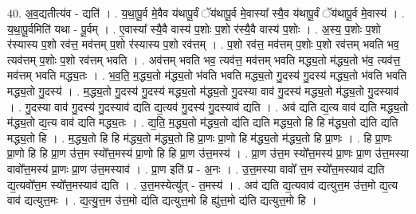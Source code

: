 \documentclass[17pt]{extarticle}
\begin{document}
40. अ॒व॒द्यतीत्य॑व - द्यति॑ । . य॒था॒पू॒र्व मे॒वैव य॑थापू॒र्वं ॅय॑थापू॒र्व मे॒वास्या᳚ स्यै॒व य॑थापू॒र्वं ॅय॑थापू॒र्व मे॒वास्य॑ । . य॒था॒पू॒र्वमिति॑ यथा - पू॒र्वम् । . ए॒वास्या᳚ स्यै॒वै वास्य॑ प॒शोः प॒शो र॑स्यै॒वै वास्य॑ प॒शोः । . अ॒स्य॒ प॒शोः प॒शो र॑स्यास्य प॒शो रव॑त्त॒ मव॑त्तम् प॒शो र॑स्यास्य प॒शो रव॑त्तम् । . प॒शो रव॑त्त॒ मव॑त्तम् प॒शोः प॒शो रव॑त्तम् भवति भव॒ त्यव॑त्तम् प॒शोः प॒शो रव॑त्तम् भवति । . अव॑त्तम् भवति भव॒ त्यव॑त्त॒ मव॑त्तम् भवति मद्ध्य॒तो म॑द्ध्य॒तो भ॑व॒ त्यव॑त्त॒ मव॑त्तम् भवति मद्ध्य॒तः । . भ॒व॒ति॒ म॒द्ध्य॒तो म॑द्ध्य॒तो भ॑वति भवति मद्ध्य॒तो गु॒दस्य॑ गु॒दस्य॑ मद्ध्य॒तो भ॑वति भवति मद्ध्य॒तो गु॒दस्य॑ । . म॒द्ध्य॒तो गु॒दस्य॑ गु॒दस्य॑ मद्ध्य॒तो म॑द्ध्य॒तो गु॒दस्या वाव॑ गु॒दस्य॑ मद्ध्य॒तो म॑द्ध्य॒तो गु॒दस्याव॑ । . गु॒दस्या वाव॑ गु॒दस्य॑ गु॒दस्याव॑ द्यति द्य॒त्यव॑ गु॒दस्य॑ गु॒दस्याव॑ द्यति । . अव॑ द्यति द्य॒त्य वाव॑ द्यति मद्ध्य॒तो म॑द्ध्य॒तो द्य॒त्य वाव॑ द्यति मद्ध्य॒तः । . द्य॒ति॒ म॒द्ध्य॒तो म॑द्ध्य॒तो द्य॑ति द्यति मद्ध्य॒तो हि हि म॑द्ध्य॒तो द्य॑ति द्यति मद्ध्य॒तो हि । . म॒द्ध्य॒तो हि हि म॑द्ध्य॒तो म॑द्ध्य॒तो हि प्रा॒णः प्रा॒णो हि म॑द्ध्य॒तो म॑द्ध्य॒तो हि प्रा॒णः । . हि प्रा॒णः प्रा॒णो हि हि प्रा॒ण उ॑त्त॒म स्यो᳚त्त॒मस्य॑ प्रा॒णो हि हि प्रा॒ण उ॑त्त॒मस्य॑ । . प्रा॒ण उ॑त्त॒म स्यो᳚त्त॒मस्य॑ प्रा॒णः प्रा॒ण उ॑त्त॒मस्या वावो᳚त्त॒मस्य॑ प्रा॒णः प्रा॒ण उ॑त्त॒मस्याव॑ । . प्रा॒ण इति॑ प्र - अ॒नः । . उ॒त्त॒मस्या वावो᳚ त्त॒म स्यो᳚त्त॒मस्याव॑ द्यति द्य॒त्यवो᳚त्त॒म स्यो᳚त्त॒मस्याव॑ द्यति । . उ॒त्त॒मस्येत्यु॑त् - त॒मस्य॑ । . अव॑ द्यति द्य॒त्यवाव॑ द्यत्युत्त॒म उ॑त्त॒मो द्य॒त्य वाव॑ द्यत्युत्त॒मः । . द्य॒त्यु॒त्त॒म उ॑त्त॒मो द्य॑ति द्यत्युत्त॒मो हि ह्यु॑त्त॒मो द्य॑ति द्यत्युत्त॒मो हि । \newline
\pagebreak
{}
\end{document}
